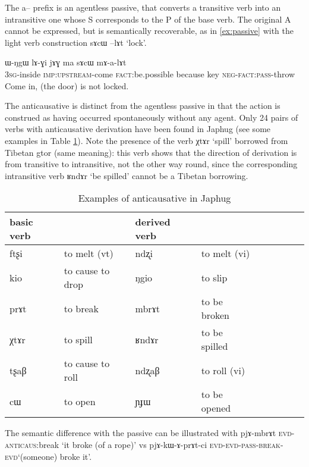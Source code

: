 \documentclass[oldfontcommands,oneside,a4paper,11pt]{article}
\newcommand{\ipa}[1]{{\phon #1}} %
\begin{document}
The  \ipa{a--} prefix is an agentless passive, that converts a transitive verb into an intransitive one whose S corresponds to the P of the base verb. The original A cannot be expressed, but is semantically recoverable, as in \ref{ex:passive} with the light verb construction \ipa{sɤcɯ --lɤt} `lock'. 

\begin{exe}
\ex \label{ex:passive}
\gll 
\ipa{ɯ-ŋgɯ} 	\ipa{lɤ-ɣi} 	\ipa{jɤɣ} 	\ipa{ma} 	\ipa{sɤcɯ} 	\ipa{mɤ-a-lɤt} \\
\textsc{3sg}-inside \textsc{imp:upstream}-come \textsc{fact}:be.possible because key \textsc{neg-fact:pass}-throw \\
\glt Come in, (the door) is not locked.
\end{exe}

The anticausative is distinct from the agentless passive in that the action is construed as having occurred spontaneously without any agent. Only 24 pairs of verbs with anticausative derivation have been found in Japhug (see some examples in Table \ref{tab:anticausative}). Note the presence of the verb \ipa{χtɤr} `spill' borrowed from Tibetan \ipa{gtor} (same meaning): this verb shows that the direction of derivation is from transitive to intransitive, not the other way round, since the corresponding intransitive verb \ipa{ʁndɤr} `be spilled' cannot be a Tibetan borrowing.


\begin{table}[H]
\caption{Examples of anticausative in Japhug}\label{tab:anticausative}
\begin{tabular}{lllllllll} \toprule
basic verb  & &derived  verb &\\
\midrule
\ipa{ftʂi}  &	to melt (vt)	&		\ipa{ndʐi}  &	to melt (vi)		\\
\ipa{kio}  &	to cause to drop	&		\ipa{ŋgio}  &	to slip		\\
\ipa{prɤt}  &	to break	&		\ipa{mbrɤt}  &		to be broken	\\
\ipa{χtɤr}  &	 to spill	&		\ipa{ʁndɤr}  &		to be spilled	\\
\ipa{tʂaβ}  &	to cause to roll	&		\ipa{ndʐaβ}  &	to roll (vi)		\\
   \ipa{cɯ}  &	 to open 	&		\ipa{ɲɟɯ}  &	 to be opened	 	\\ 
 \bottomrule
\end{tabular}
\end{table}

The semantic difference with the passive can be illustrated with \ipa{pjɤ-mbrɤt} \textsc{evd-anticaus}:break `it broke (of a rope)' vs \ipa{pjɤ-kɯ-ɤ-prɤt-ci} \textsc{evd-evd-pass-break}-\textsc{evd}`(someone) broke it'.
\end{document}

